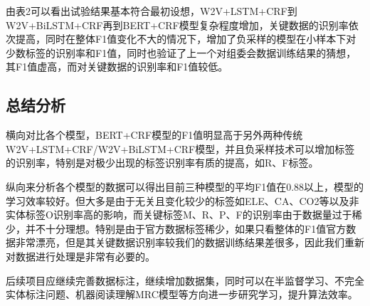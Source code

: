 \documentclass{article}
\begin{document}
由表2可以看出试验结果基本符合最初设想，W2V+LSTM+CRF到W2V+BiLSTM+CRF再到BERT+CRF模型复杂程度增加，关键数据的识别率依次提高，同时在整体F1值变化不大的情况下，增加了负采样的模型在小样本下对少数标签的识别率和F1值，同时也验证了上一个对组委会数据训练结果的猜想，其F1值虚高，而对关键数据的识别率和F1值较低。

\newpage
\begin{center}
	\section{总结分析}
\end{center}


横向对比各个模型，BERT+CRF模型的F1值明显高于另外两种传统W2V+LSTM+CRF/W2V+BiLSTM+CRF模型，并且负采样技术可以增加标签的识别率，特别是对极少出现的标签识别率有质的提高，如R、F标签。

纵向来分析各个模型的数据可以得出目前三种模型的平均F1值在0.88以上，模型的学习效率较好。但大多是由于无关且变化较少的标签如ELE、CA、CO2等以及非实体标签O识别率高的影响，而关键标签M、R、P、F的识别率由于数据量过于稀少，并不十分理想。特别是由于官方数据标签稀少，如果只看整体的F1值官方数据非常漂亮，但是其关键数据识别率较我们的数据训练结果差很多，因此我们重新对数据进行处理是非常有必要的。

后续项目应继续完善数据标注，继续增加数据集，同时可以在半监督学习、不完全实体标注问题、机器阅读理解MRC模型等方向进一步研究学习，提升算法效率。

\newpage

\begin{center}
	
\end{center}
\end{document}
